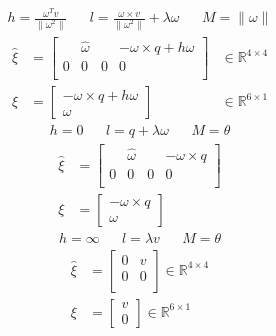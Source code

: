         \begin{align*}
            h = \frac{\omega^T v}{\lVert \omega^2 \rVert} && l = \frac{\omega \times v}{\lVert \omega^2 \rVert} + \lambda \omega && M = \lVert \omega \rVert
        \end{align*}
        \begin{align*}
            \widehat{\xi} &= 
                \begin{bmatrix}
                    &\widehat{\omega} & & - \omega \times q + h \omega\\
                    0 & 0 & 0 & 0 \\
                \end{bmatrix}
            &\in \mathbb{R}^{4 \times 4}\\
            \xi &= 
                \begin{bmatrix}
                    - \omega \times q + h \omega\\
                    \omega
                \end{bmatrix}
            &\in \mathbb{R}^{6 \times 1}
        \end{align*}
        \begin{align*}
            h = 0 && l = q + \lambda \omega && M = \theta
        \end{align*}
        \begin{align*}
            \widehat{\xi} &= 
                \begin{bmatrix}
                    &\widehat{\omega} & & - \omega \times q\\
                    0 & 0 & 0 & 0 \\
                \end{bmatrix}
            \\
            \xi &= 
                \begin{bmatrix}
                    - \omega \times q\\
                    \omega
                \end{bmatrix}
        \end{align*}
        \begin{align*}
            h = \infty && l = \lambda v && M = \theta
        \end{align*}
        \begin{align*}
            \widehat{\xi} &= 
                \begin{bmatrix}
                    0 & v\\
                    0 & 0 \\
                \end{bmatrix} \in \mathbb{R}^{4 \times 4}
            \\
            \xi &= 
                \begin{bmatrix}
                   v\\
                   0    
                \end{bmatrix} \in \mathbb{R}^{6 \times 1}
        \end{align*}
